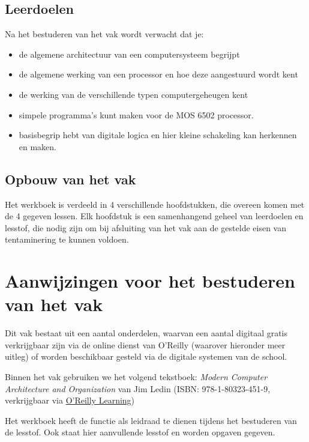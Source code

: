 
\subsection{Leerdoelen}

Na het bestuderen van het vak wordt verwacht dat je:
\begin{itemize}
    \item[--] de algemene architectuur van een computersysteem begrijpt
    \item[--] de algemene werking van een processor en hoe deze aangestuurd wordt kent
    \item[--] de werking van de verschillende typen computergeheugen kent
    \item[--] simpele programma's kunt maken voor de MOS 6502 processor.
    \item[--] basisbegrip hebt van digitale logica en hier kleine schakeling kan herkennen en maken.
\end{itemize}

\subsection{Opbouw van het vak}
Het werkboek is verdeeld in 4 verschillende hoofdstukken, die overeen komen met de 4 gegeven lessen. Elk hoofdstuk is een samenhangend geheel van leerdoelen en lesstof, die nodig zijn om bij afsluiting van het vak aan de gestelde eisen van tentaminering te kunnen voldoen.

\section{Aanwijzingen voor het bestuderen van het vak}
Dit vak bestaat uit een aantal onderdelen, waarvan een aantal digitaal gratis verkrijgbaar zijn via de online dienst van O’Reilly (waarover hieronder meer uitleg) of worden beschikbaar gesteld via de digitale systemen van de school. 

Binnen het vak gebruiken we het volgend tekstboek: 
\textit{Modern Computer Architecture and Organization} van Jim Ledin \cite{Ledin} (ISBN: 978-1-80323-451-9, verkrijgbaar via \href{https://learning.oreilly.com/}{O'Reilly Learning})

Het werkboek heeft de functie als leidraad te dienen tijdens het bestuderen van de lesstof. Ook staat hier aanvullende lesstof en worden opgaven gegeven. 

